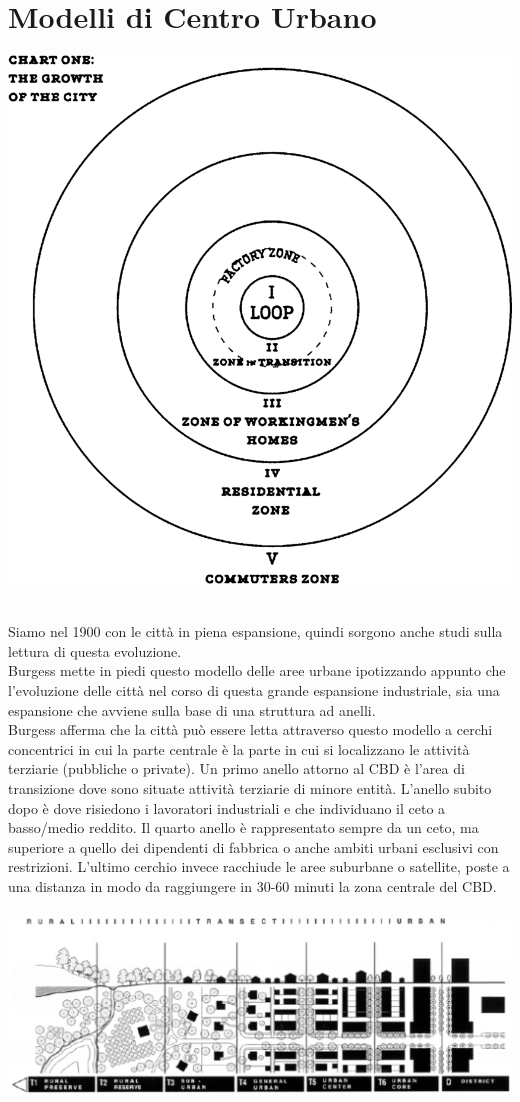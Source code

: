\documentclass[a4paper,12pt, oneside]{book}
\begin{document}
  \section{Modelli di Centro Urbano}
  \begin{center}
  	\includegraphics[width=0.6\linewidth]{"immagini/Concentric-zone-theory-Source-Burgess-1925"}
  	\label{fig:Concentric-zone-theory}
  \end{center}
  \leavevmode\\ 
  Siamo nel 1900 con le città in piena espansione, quindi sorgono anche studi sulla lettura di questa evoluzione.\\
  Burgess mette in piedi questo modello delle aree urbane ipotizzando appunto che l'evoluzione delle città nel corso di questa grande espansione industriale, sia una espansione che avviene sulla base di una struttura ad anelli.\\
  Burgess afferma che la città può essere letta attraverso questo modello a cerchi concentrici in cui la parte centrale è la parte in cui si localizzano le attività terziarie (pubbliche o private). Un primo anello attorno al CBD è l'area di transizione dove sono situate attività terziarie di minore entità. L'anello subito dopo è dove risiedono i lavoratori industriali e che individuano il ceto a basso/medio reddito. Il quarto anello è rappresentato sempre da un ceto, ma superiore a quello dei dipendenti di fabbrica o anche ambiti urbani esclusivi con restrizioni. L'ultimo cerchio invece racchiude le aree suburbane o satellite, poste a una distanza in modo da raggiungere in 30-60 minuti la zona centrale del CBD.\\
  \begin{center}
  	\includegraphics[width=0.8\linewidth]{"immagini/transect urban"}
  	\label{fig:transect urban}
  \end{center}
\end{document}
